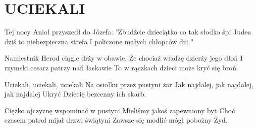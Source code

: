 \documentclass[../../../songbook.tex]{subfiles}
\begin{document}
\TabPositions{8cm} %
\section*{UCIEKALI}
{}
\vspace{0.5cm}
Tej nocy Anioł przyszedł do Józefa:			 \newline	
"Zbudźcie dzieciątko co tak słodko śpi		 \newline	
Judea dziś to niebezpieczna strefa			 \newline	
I policzone małych chłopców dni."			 \newline	

Namiestnik Herod ciągle drży w obawie,		 \newline	
Że chociaż władzę dzierży jego dłoń			 \newline	
I rzymski cesarz patrzy nań łaskawie		 \newline	
To w rączkach dzieci może kryć się broń.	 \newline	

\-\hspace{1cm}Uciekali, uciekali, uciekali				 \newline	
\-\hspace{1cm}Na osiołku przez pustyni żar				 \newline	
\-\hspace{1cm}Jak najdalej, jak najdalej, jak najdalej	 \newline	
\-\hspace{1cm}Ukryć Dziecię bezcenny ich skarb.			 \newline	

Ciężko ojczyznę wspominać w pustyni			\newline
Mieliśmy jakoś zapewniony byt			\newline
Choć czasem patrol mijał drzwi świątyni			\newline
Zawsze się modlić mógł pobożny Żyd.			\newline
\end{document}
